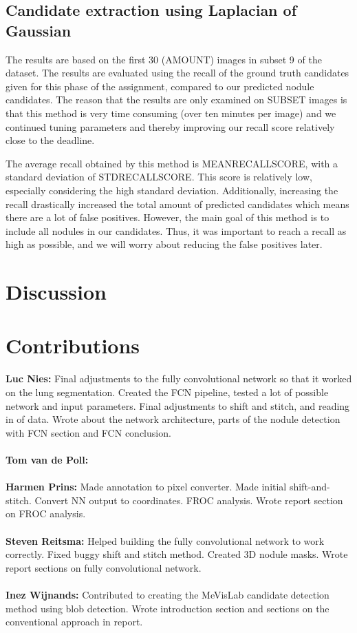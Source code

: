 \documentclass{article}
\begin{document}
\subsection{Candidate extraction using Laplacian of Gaussian}
The results are based on the first 30 (AMOUNT) images in subset 9 of the dataset. The results are evaluated using the recall of the ground truth candidates given for this phase of the assignment, compared to our predicted nodule candidates. The reason that the results are only examined on SUBSET images is that this method is very time consuming (over ten minutes per image) and we continued tuning parameters and thereby improving our recall score relatively close to the deadline.

The average recall obtained by this method is MEANRECALLSCORE, with a standard deviation of STDRECALLSCORE. This score is relatively low, especially considering the high standard deviation. Additionally, increasing the recall drastically increased the total amount of predicted candidates which means there are a lot of false positives. However, the main goal of this method is to include all nodules in our candidates. Thus, it was important to reach a recall as high as possible, and we will worry about reducing the false positives later.

\section{Discussion}\label{sec:discussion}


\appendix
\section{Contributions}
\textbf{Luc Nies:} Final adjustments to the fully convolutional network so that it worked on the lung segmentation. Created the FCN pipeline, tested a lot of possible network and input parameters. Final adjustments to shift and stitch, and reading in of data. Wrote about the network architecture, parts of the nodule detection with FCN section and FCN conclusion.\\
\\
\textbf{Tom van de Poll:} \\
\\
\textbf{Harmen Prins:} Made annotation to pixel converter. Made initial shift-and-stitch. Convert NN output to coordinates. FROC analysis. Wrote report section on FROC analysis.
\\
\\
\textbf{Steven Reitsma:} Helped building the fully convolutional network to work correctly. Fixed buggy shift and stitch method. Created 3D nodule masks. Wrote report sections on fully convolutional network. \\
\\
\textbf{Inez Wijnands:} Contributed to creating the MeVisLab candidate detection method using blob detection. Wrote introduction section and sections on the conventional approach in report.
\end{document}
